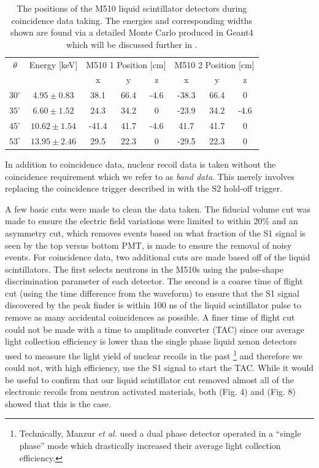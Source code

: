 \begin{table}[t]
\centering
\def\arraystretch{1.3}
\begin{tabular}{cc|ccc|ccc}
\hline
$\theta$ & Energy [keV] & \multicolumn{3}{c|}{M510 1 Position [cm]} & \multicolumn{3}{c}{M510 2 Position [cm]} \\
 & & x & y & z & x & y & z \\
\hline
$30^{\circ}$ & $4.95 \pm 0.83$ & 38.1 & 66.4 & -4.6 & -38.3 & 66.4 & 0 \\
$35^{\circ}$ & $6.60 \pm 1.52$ & 24.3 & 34.2 & 0 & -23.9 & 34.2 & -4.6 \\
$45^{\circ}$ & $10.62 \pm 1.54$ & -41.4 & 41.7 & -4.6 & 41.7 & 41.7 & 0 \\
$53^{\circ}$ & $13.95 \pm 2.46$ & 29.5 & 22.3 & 0 & -29.5 & 22.3 & 0 \\
\hline
\end{tabular}
\caption{The positions of the M510 liquid scintillator detectors during coincidence data taking.  The energies and corresponding widths shown are found via a detailed Monte Carlo produced in Geant4 which will be discussed further in .}
\label{tab:nerix_ej_positions}
\end{table}

In addition to coincidence data, nuclear recoil data is taken without the coincidence requirement which we refer to as \textit{band data}.  This merely involves replacing the coincidence trigger described in  with the S2 hold-off trigger.

A few basic cuts were made to clean the data taken.  The fiducial volume cut was made to ensure the electric field variations were limited to within 20\% and an asymmetry cut, which removes events based on what fraction of the S1 signal is seen by the top versus bottom PMT, is made to ensure the removal of noisy events.  For coincidence data, two additional cuts are made based off of the liquid scintillators.  The first selects neutrons in the M510s using the pulse-shape discrimination parameter of each detector.  The second is a coarse time of flight cut (using the time difference from the waveform) to ensure that the S1 signal discovered by the peak finder is within 100 ns of the liquid scintillator pulse to remove as many accidental coincidences as possible.  A finer time of flight cut could not be made with a time to amplitude converter (TAC) since our average light collection efficiency is lower than the single phase liquid xenon detectors used to measure the light yield of nuclear recoils in the past \cite{aprile2009new, manzur2010scintillation, plante2011new}\footnote{Technically,  Manzur \textit{et al.} used a dual phase detector operated in a ``single phase'' mode which drastically increased their average light collection efficiency.} and therefore we could not, with high efficiency, use the S1 signal to start the TAC.  While it would be useful to confirm that our liquid scintillator cut removed almost all of the electronic recoils from neutron activated materials, both  (Fig. 4) and  (Fig. 8) showed that this is the case.

